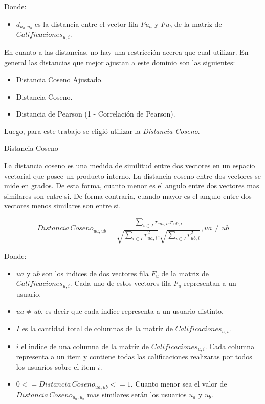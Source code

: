 \documentclass[11pt,a4paper,twoside]{thesis}
\begin{document}
\begin{description}
	\item[Donde:]
\end{description}
\begin{itemize}
	\item $d_{u_a,u_b}$ es la distancia entre el vector fila $F{u_a}$ y $F{u_b}$ de la matriz de $Calificaciones_{u,i}$.
\end{itemize}

En cuanto a las distancias, no hay una restricción acerca que cual utilizar. En
general las distancias que mejor ajustan a este dominio son las siguientes:

\begin{itemize}
	\item Distancia Coseno Ajustado.
	\item Distancia Coseno.
	\item Distancia de Pearson (1 - Correlación de Pearson).
\end{itemize}

Luego, para este trabajo se eligió utilizar la \textit{Distancia Coseno}.

\begin{description}
	\item[Distancia Coseno]
\end{description}

La distancia coseno es una medida de similitud entre dos vectores en un espacio
vectorial que posee un producto interno. La distancia coseno entre dos vectores
se mide en grados. De esta forma, cuanto menor es el angulo entre dos vectores
mas similares son entre si. De forma contraria, cuando mayor es el angulo entre
dos vectores menos similares son entre si.

\begin{equation}
	Distancia \mspace{3mu}Coseno_{ua, ub} = \frac{ \sum_{i \in I} r_{ua, i}.r_{ub, i}}{\sqrt{\sum_{i \in I} r_{ua, i}^2}.\sqrt{\sum_{i \in I} r_{ub, i}^2}  }, ua \neq ub
\end{equation}

\begin{description}
	\item[Donde:]
\end{description}
\begin{itemize}
	\item $ua$ y $ub$ son los indices de dos vectores fila $F_u$ de la matriz de $Calificaciones_{u,i}$. Cada uno de estos vectores fila $F_u$ representan a un usuario.
	\item $ua \neq ub$, es decir que cada indice representa a un usuario distinto.
	\item $I$ es la cantidad total de columnas de la matriz de $Calificaciones_{u,i}$.
	\item $i$ el indice de una columna de la matriz de $Calificaciones_{u,i}$. Cada columna representa a un item y contiene todas las calificaciones realizaras por todos los usuarios sobre el item $i$.
	\item $0 <= Distancia \mspace{3mu} Coseno_{ua, ub} <= 1$. Cuanto menor sea el valor de $Distancia \mspace{3mu} Coseno_{u_a, u_b}$ mas similares serán los usuarios $u_a$ y $u_b$.
\end{itemize}
\end{document}

